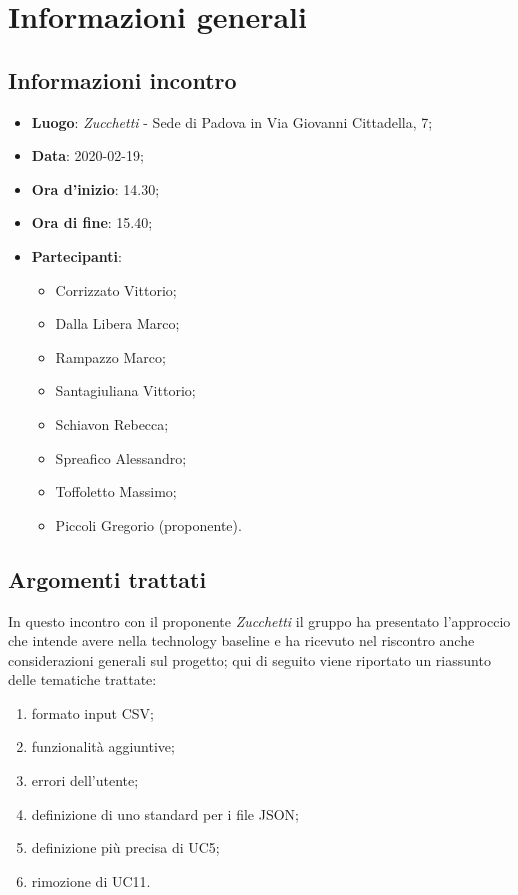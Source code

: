 \section{Informazioni generali}
    \subsection{Informazioni incontro}
        \begin{itemize}
            \item \textbf{Luogo}: \textit{Zucchetti} - Sede di Padova in Via Giovanni Cittadella, 7;
            \item \textbf{Data}: 2020-02-19;
            \item \textbf{Ora d'inizio}: 14.30;
            \item \textbf{Ora di fine}: 15.40;
            \item \textbf{Partecipanti}: 
            \begin{itemize}
                \item Corrizzato Vittorio;
                \item Dalla Libera Marco;
                \item Rampazzo Marco;
                \item Santagiuliana Vittorio;
                \item Schiavon Rebecca;
                \item Spreafico Alessandro;
                \item Toffoletto Massimo;
                \item Piccoli Gregorio (proponente).
            \end{itemize}
        \end{itemize}
    \subsection{Argomenti trattati}
        In questo incontro con il proponente \textit{Zucchetti} il gruppo ha presentato l'approccio che intende avere nella technology baseline e ha ricevuto nel riscontro anche considerazioni generali sul progetto\glo; qui di seguito viene riportato un riassunto delle tematiche trattate:
        \begin{enumerate}
            \item formato input CSV;
            \item funzionalità aggiuntive;
            \item errori dell'utente;
            \item definizione di uno standard per i file JSON;
            \item definizione più precisa di UC5;
            \item rimozione di UC11.
        \end{enumerate}
